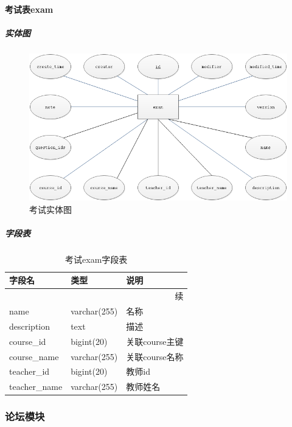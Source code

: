 \documentclass[titlepage,UTF8,linespread=1.5]{ctexart}
\begin{document}
\paragraph{考试表exam}
\subparagraph{实体图}
\begin{figure}[H]
    \centering
    \includegraphics[width=140mm]{entity-exam.png}
    \caption{考试实体图}
    \label{fig:entity-exam}
\end{figure}
\subparagraph{字段表}
\begin{longtable}{|p{10em}|p{6em}|p{15em}|}
    \caption{考试exam字段表}\label{tab:table_exam}       \\\hline
    字段名         & 类型         & 说明                 \\\hline
    \endfirsthead
    \multicolumn{3}{r}{{续\tablename\thetable{}}}        \\\hline
    \endhead
    name           & varchar(255) & 名称                 \\\hline
    description    & text         & 描述                 \\\hline
    course\_id     & bigint(20)   & 关联course主键       \\\hline
    course\_name   & varchar(255) & 关联course名称       \\\hline
    teacher\_id    & bigint(20)   & 教师id               \\\hline
    teacher\_name  & varchar(255) & 教师姓名             \\\hline
\end{longtable}\par

\subsubsection{论坛模块}
\end{document}
